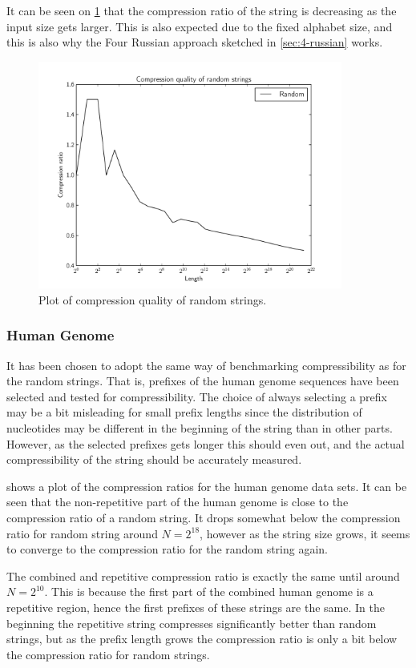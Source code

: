 \documentclass[twoside,11pt,openright]{report}
\begin{document}
It can be seen on \cref{fig:compression:quality:random} that the compression ratio of the string is decreasing as the input size gets larger. This is also expected due to the fixed alphabet size, and this is also why the Four Russian approach sketched in \cref{sec:4-russian} works.
%
\begin{figure}[h!]
  \centering
  \includegraphics[width=10cm]{compression/random}
  \caption{Plot of compression quality of random strings.}
  \label{fig:compression:quality:random}
\end{figure}

\subsubsection{Human Genome}
It has been chosen to adopt the same way of benchmarking compressibility as for the random strings. That is, prefixes of the human genome sequences have been selected and tested for compressibility. The choice of always selecting a prefix may be a bit misleading for small prefix lengths since the distribution of nucleotides may be different in the beginning of the string than in other parts. However, as the selected prefixes gets longer this should even out, and the actual compressibility of the string should be accurately measured.

 shows a plot of the compression ratios for the human genome data sets. It can be seen that the non-repetitive part of the human genome is close to the compression ratio of a random string. It drops somewhat below the compression ratio for random string around $N = 2^{18}$, however as the string size grows, it seems to converge to the compression ratio for the random string again.

The combined and repetitive compression ratio is exactly the same until around $N = 2^{10}$. This is because the first part of the combined human genome is a repetitive region, hence the first prefixes of these strings are the same. In the beginning the repetitive string compresses significantly better than random strings, but as the prefix length grows the compression ratio is only a bit below the compression ratio for random strings.
\end{document}
